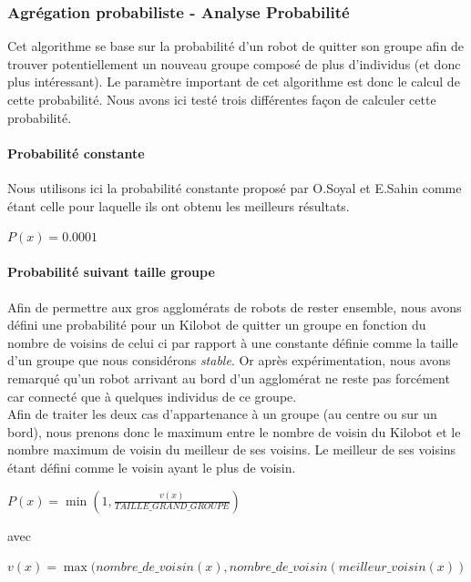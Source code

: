 \documentclass[a4paper]{article}
\begin{document}
\subsubsection{Agrégation probabiliste - Analyse Probabilité}
Cet algorithme se base sur la probabilité d'un robot de quitter son groupe afin de trouver potentiellement un nouveau groupe composé de plus d'individus (et donc plus intéressant). Le paramètre important de cet algorithme est donc le calcul de cette probabilité. Nous avons ici testé trois différentes façon de calculer cette probabilité.
\paragraph{Probabilité constante} Nous utilisons ici la probabilité constante proposé par O.Soyal et E.Sahin comme étant celle pour laquelle ils ont obtenu les meilleurs résultats.
\begin{center}
	$P(x)=0.0001$
\end{center}
\paragraph{Probabilité suivant taille groupe} Afin de permettre aux gros agglomérats de robots de rester ensemble, nous avons défini une probabilité pour un Kilobot de quitter un groupe en fonction du nombre de voisins de celui ci par rapport à une constante définie comme la taille d'un groupe que nous considérons \textit{stable}. Or après expérimentation, nous avons remarqué qu'un robot arrivant au bord d'un agglomérat ne reste pas forcément car connecté que à quelques individus de ce groupe.\\Afin de traiter les deux cas d'appartenance à un groupe (au centre ou sur un bord), nous prenons donc le maximum entre le nombre de voisin du Kilobot et le nombre maximum de voisin du meilleur de ses voisins. Le meilleur de ses voisins étant défini comme le voisin ayant le plus de voisin.
\begin{center}
	$P(x)=\min(1,\frac{v(x)}{TAILLE\_GRAND\_GROUPE})$
\end{center}
avec
\begin{center}
	$v(x)=\max(nombre\_de\_voisin(x),nombre\_de\_voisin(meilleur\_voisin(x))$
\end{center}
\end{document}
